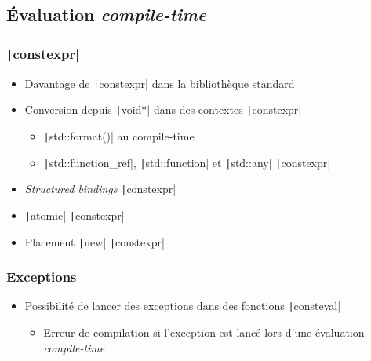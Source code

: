 \documentclass[C++.tex]{subfiles}
\begin{document}
\subsection*{Évaluation \textit{compile-time}}
\begin{frame}[fragile]
	\frametitle{\texttt|constexpr|}
	\begin{itemize}
		\item Davantage de \texttt|constexpr| dans la bibliothèque standard
		\item Conversion depuis \texttt|void*| dans des contextes \texttt|constexpr|
		\begin{itemize}
			\item \texttt|std::format()| au compile-time
			\item \texttt|std::function_ref|, \texttt|std::function| et \texttt|std::any| \texttt|constexpr|
		\end{itemize}
		\item \textit{Structured bindings} \texttt|constexpr|
		\item \texttt|atomic| \texttt|constexpr|
		\item Placement \texttt|new| \texttt|constexpr|
	\end{itemize}

\end{frame}

\begin{frame}[fragile]
	\frametitle{Exceptions}
	\begin{itemize}
		\item Possibilité de lancer des exceptions dans des fonctions \texttt|consteval|
		\begin{itemize}
			\item Erreur de compilation si l'exception est lancé lors d'une évaluation \textit{compile-time}
		\end{itemize}
	\end{itemize}

\end{frame}
\end{document}
